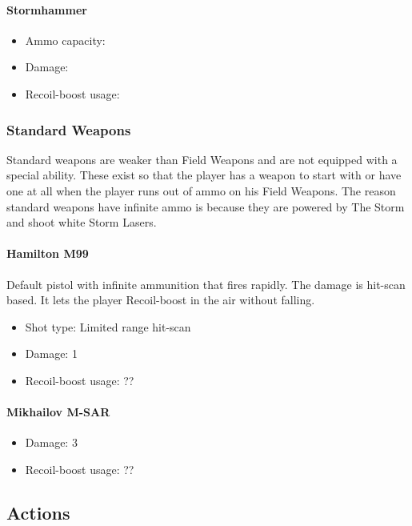 \documentclass[12pt]{article}
\begin{document}
\paragraph{Stormhammer}

\begin{itemize}
	\item Ammo capacity: 
	\item Damage: 
	\item Recoil-boost usage:
\end{itemize}

\subsubsection{Standard Weapons}

Standard weapons are weaker than Field Weapons and are not equipped with a special ability. These exist so that the player has a weapon to start with or have one at all when the player runs out of ammo on his Field Weapons. The reason standard weapons have infinite ammo is because they are powered by The Storm and shoot white Storm Lasers. 

\paragraph{Hamilton M99} 

Default pistol with infinite ammunition that fires rapidly. The damage is hit-scan based. It lets the player Recoil-boost in the air without falling.

\begin{itemize}
	\item Shot type: Limited range hit-scan
	\item Damage: 1
	\item Recoil-boost usage: ??
\end{itemize}

\paragraph{Mikhailov M-SAR} 

\begin{itemize}
	\item Damage: 3
	\item Recoil-boost usage: ??
\end{itemize}

\subsection{Actions}
\end{document}
